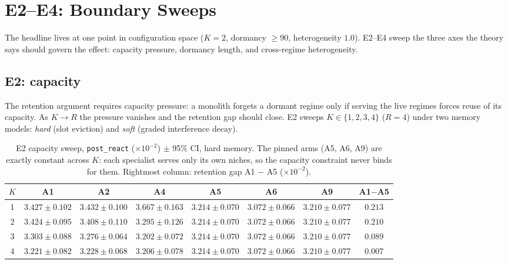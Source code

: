\documentclass[11pt,a4paper]{article}
\theoremstyle{definition}
\theoremstyle{plain}
\begin{document}
\section{E2--E4: Boundary Sweeps}
\label{sec:dd5-sweeps}

The headline lives at one point in configuration space ($K=2$, dormancy
$\ge 90$, heterogeneity $1.0$). E2--E4 sweep the three axes the theory says
should govern the effect: capacity pressure, dormancy length, and
cross-regime heterogeneity.

\subsection{E2: capacity}
\label{sec:dd5-e2}

The retention argument requires capacity pressure: a monolith forgets a
dormant regime only if serving the live regimes forces reuse of its
capacity. As $K \to R$ the pressure vanishes and the retention gap should
close. E2 sweeps $K \in \{1,2,3,4\}$ ($R = 4$) under two memory models:
\emph{hard} (slot eviction) and \emph{soft} (graded interference decay).

\begin{table}[h]
\centering
\caption{E2 capacity sweep, \texttt{post\_react} ($\times 10^{-2}$) $\pm$
95\% CI, hard memory. The pinned arms (A5, A6, A9) are exactly constant
across $K$: each specialist serves only its own niches, so the capacity
constraint never binds for them. Rightmost column: retention gap
A1 $-$ A5 ($\times 10^{-2}$).}
\label{tab:dd5-e2-hard}
\small
\begin{tabular}{cccccccc}
\toprule
$K$ & A1 & A2 & A4 & A5 & A6 & A9 & A1$-$A5 \\
\midrule
1 & $3.427 \pm 0.102$ & $3.432 \pm 0.100$ & $3.667 \pm 0.163$ & $3.214 \pm 0.070$ & $3.072 \pm 0.066$ & $3.210 \pm 0.077$ & $0.213$ \\
2 & $3.424 \pm 0.095$ & $3.408 \pm 0.110$ & $3.295 \pm 0.126$ & $3.214 \pm 0.070$ & $3.072 \pm 0.066$ & $3.210 \pm 0.077$ & $0.210$ \\
3 & $3.303 \pm 0.088$ & $3.276 \pm 0.064$ & $3.202 \pm 0.072$ & $3.214 \pm 0.070$ & $3.072 \pm 0.066$ & $3.210 \pm 0.077$ & $0.089$ \\
4 & $3.221 \pm 0.082$ & $3.228 \pm 0.068$ & $3.206 \pm 0.078$ & $3.214 \pm 0.070$ & $3.072 \pm 0.066$ & $3.210 \pm 0.077$ & $0.007$ \\
\bottomrule
\end{tabular}
\end{table}
\end{document}
